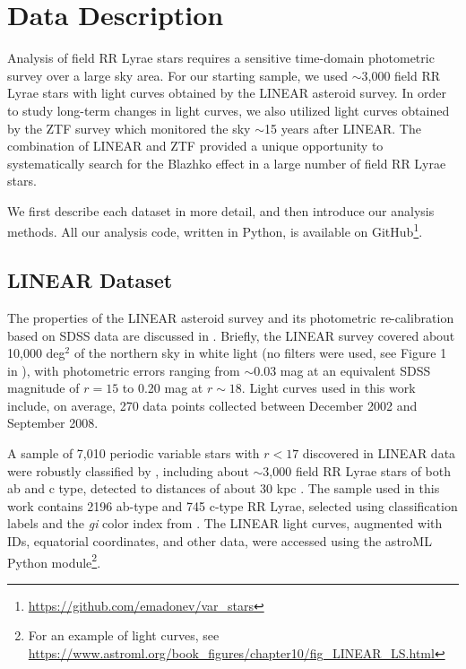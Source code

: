 
\phantom{There is some latex bug somewhere and this call is needed to make it make pdf...}

\section{Data Description \label{sec:data}}

Analysis of field RR Lyrae stars requires a sensitive time-domain photometric survey over a large sky area.
For our starting sample, we used $\sim$3,000 field RR Lyrae stars with light curves obtained by the LINEAR
asteroid survey. In order to study long-term changes in light curves, we also utilized light curves obtained
by the ZTF survey which monitored the sky $\sim$15 years after LINEAR. The combination of LINEAR and
ZTF provided a unique opportunity to systematically search for the Blazhko effect in a large number of
field RR Lyrae stars.


We first describe each dataset in more detail, and then introduce our analysis methods. All our analysis
code, written in Python, is available on GitHub\footnote{\url{https://github.com/emadonev/var_stars}}.  
 


\subsection{LINEAR Dataset}

The properties of the LINEAR asteroid survey and its photometric re-calibration based on SDSS data are discussed
in \cite{2011AJ....142..190S}. Briefly, the LINEAR survey covered about 10,000 deg$^2$ of the northern sky in white
light (no filters were used, see Figure 1 in \citealt{2011AJ....142..190S}), with photometric errors ranging from $\sim$0.03
mag at an equivalent SDSS magnitude of $r=15$ to 0.20 mag at $r\sim18$. Light curves used in this work include,
on average, 270 data points collected between December 2002 and September 2008.
 
A sample of 7,010 periodic variable stars with $r<17$ discovered in LINEAR data were robustly classified by
\cite{2013AJ....146..101P}, including
about $\sim$3,000 field RR Lyrae stars of both ab and c type, detected to distances of about 30 kpc \citep{2013AJ....146...21S}.
The sample used in this work contains 2196 ab-type and 745 c-type RR Lyrae, selected using classification labels and the {\it gi}
color index from \cite{2013AJ....146..101P}.
The LINEAR light curves, augmented with IDs, equatorial coordinates, and other data, were accessed using the astroML Python
module\footnote{For an example of light curves, see \url{https://www.astroml.org/book_figures/chapter10/fig_LINEAR_LS.html}}.  


